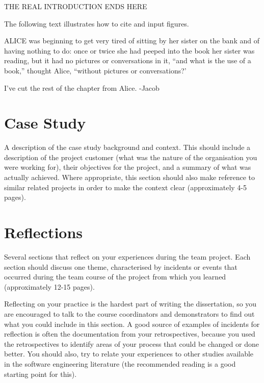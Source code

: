\documentclass{l3proj}
\begin{document}
THE REAL INTRODUCTION ENDS HERE

The following text illustrates how to cite and input figures.

ALICE \cite{alice} was beginning to get very tired of sitting by her sister
on the bank and of having nothing to do: once or twice she had peeped into
the book her sister was reading, but it had no pictures or conversations in
it, ``and what is the use of a book,'' thought Alice, ``without pictures or
conversations?'



I've cut the rest of the chapter from Alice. -Jacob

\chapter{Case Study}
\label{case}

A description of the case study background and context. This should include a description of the project customer (what was the nature of the organisation you were working for), their objectives for the project, and a summary of what was actually achieved. Where appropriate, this section should also make reference to similar related projects in order to make the context clear (approximately 4-5 pages).

\chapter{Reflections}

Several sections that reflect on your experiences during the team project. Each section should discuss one theme, characterised by incidents or events that occurred during the team course of the project from which you learned (approximately 12-15 pages).

Reflecting on your practice is the hardest part of writing the dissertation, so you are encouraged to talk to the course coordinators and demonstrators to find out what you could include in this section. A good source of examples of incidents for reflection is often the documentation from your retrospectives, because you used the retrospectives to identify areas of your process that could be changed or done better. You should also, try to relate your experiences to other studies available in the software engineering literature (the recommended reading is a good starting point for this).
\end{document}
